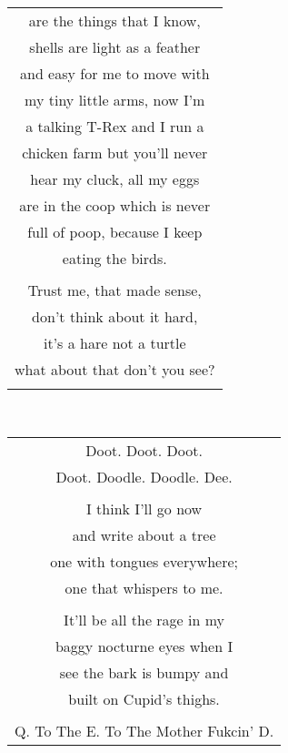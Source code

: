 \documentclass{article}
\begin{document}
\begin{center}
\begin{tabular}{c}
are the things that I know, \\
shells are light as a feather \\
and easy for me to move with \\
my tiny little arms, now I'm \\
a talking T-Rex and I run a \\
chicken farm but you'll never \\
hear my cluck, all my eggs \\
are in the coop which is never \\
full of poop, because I keep \\
eating the birds. \\
\\
Trust me, that made sense, \\
don't think about it hard, \\
it's a hare not a turtle \\
what about that don't you see? \\
\\
\end{tabular} \\
\begin{tabular}{c}
Doot.  Doot.  Doot. \\
Doot.  Doodle.  Doodle.  Dee. \\
\\
I think I'll go now \\
and write about a tree \\
one with tongues everywhere; \\
one that whispers to me. \\
\\
It'll be all the rage in my \\
baggy nocturne eyes when I \\
see the bark is bumpy and \\
built on Cupid's thighs. \\
\\
Q. To The E. To The Mother Fukcin' D.
\end{tabular}
\end{center}
\end{document}

